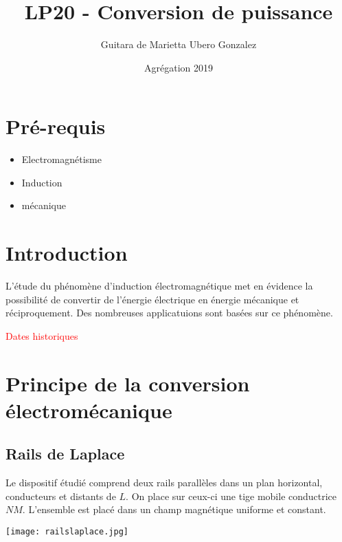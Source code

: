 \documentclass[12pt,prb,aps,epsf]{article}
\title{LP20 - Conversion de puissance}
\author{Guitara de Marietta Ubero Gonzalez}
\date{Agrégation 2019}
\begin{document}
\maketitle

\tableofcontents

\section*{Pré-requis}
\begin{itemize}
    \item Electromagnétisme 
    \item Induction
    \item mécanique
\end{itemize}



\section*{Introduction}
L'étude du phénomène d'induction électromagnétique met en évidence la possibilité de convertir de l'énergie électrique en énergie mécanique et réciproquement. Des nombreuses applicatuions sont basées sur ce phénomène.\medskip

\textcolor{red}{Dates historiques}

\section{Principe de la conversion électromécanique}



\subsection{Rails de Laplace}

Le dispositif étudié  comprend deux rails parallèles dans un plan horizontal, conducteurs et distants de $L$. On place sur ceux-ci une tige mobile conductrice $NM$. L'ensemble est placé dans un champ magnétique uniforme et constant.

\begin{center}
    \texttt{[image: railslaplace.jpg]}
\end{center}
\end{document}
